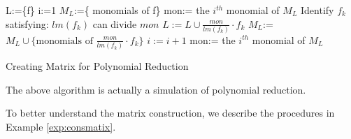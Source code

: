 \begin{algorithm}[hbt]
\SetAlgoNoLine

	L:=\{f\} \;{}
	i:=1\;
	$M_{L}$:=\{ monomials of f\} \;{}
	mon:= the $i^{th}$ monomial of $M_{L}$\;
		{
			Identify $f_{k}$ satisfying: $lm(f_{k})$ can divide $mon$ \;
			$L:=L \cup \frac{mon}{lm(f_{k})}\cdot f_{k}$ \;
			$M_{L}$:=$M_{L} \cup \{ \text{monomials of } \frac{mon}{lm(f_{k})}\cdot f_{k}\}$ \;
			$i:=i+1$\;{}
			mon:= the $i^{th}$ monomial of $M_{L}$\;
		}
\caption{Creating Matrix for Polynomial Reduction}\label{alg:matrix}
\end{algorithm}

The above algorithm is actually a simulation of polynomial reduction. 

To better understand the matrix construction, we describe the procedures in Example \ref{exp:consmatix}.

